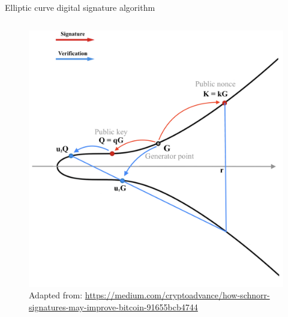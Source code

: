 \documentclass[slidescentered]{beamer}
\newcommand{\source}[1]{\caption*{\tiny Adapted from: {#1}} }
\begin{document}
\begin{frame}{Elliptic curve digital signature algorithm}
\begin{columns}
\begin{column}{0.5\linewidth}
\begin{figure}
{						\source{\tiny \url{https://medium.com/cryptoadvance/how-schnorr-signatures-may-improve-bitcoin-91655bcb4744}}}
					 {\vspace*{-0.5cm}
						\hspace*{-1cm}
						\includegraphics[scale=0.29]{images/ECDSA7}
						\source{\tiny \url{https://medium.com/cryptoadvance/how-schnorr-signatures-may-improve-bitcoin-91655bcb4744}}}
				\end{figure}
			\end{column}
		\end{columns}
	\end{frame}
	
\end{document}
